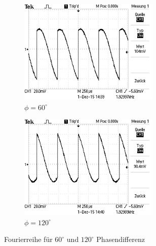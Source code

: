 \begin{figure}
  \centering
  \begin{subfigure}{0.48\textwidth}
    \centering
    \includegraphics[height=5cm]{picture/2.JPG}
    \caption{$\phi = 60^{\circ}$}
  \end{subfigure}
  \begin{subfigure}{0.48\textwidth}
    \centering
    \includegraphics[height=5cm]{picture/3.JPG}
    \caption{$\phi = 120^{\circ}$}
  \end{subfigure}
  \caption{Fourierreihe für $60^{\circ}$ und $120^{\circ}$ Phasendifferenz}
  \label{fig:graph1}
\end{figure}
